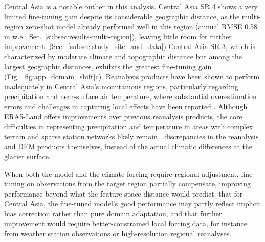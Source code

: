 \documentclass[draft]{agujournal2019}
\begin{document}
Central Asia is a notable outlier in this analysis. Central Asia SR 4 shows a very limited fine-tuning gain despite its considerable geographic distance, as the multi-region zero-shot model already performed well in this region (annual RMSE 0.58 m w.e.; Sec.~\ref{subsec:results-multi-region}), leaving little room for further improvement. (Sec.~\ref{subsec:study_site_and_data}) Central Asia SR 3, which is characterized by moderate climate and topographic distance but among the largest geographic distances, exhibits the greatest fine-tuning gain (Fig.~\ref{fig:app_domain_shift}c).  Reanalysis products have been shown to perform inadequately in Central Asia's mountainous regions, particularly regarding precipitation and near-surface air temperature, where substantial overestimation errors and challenges in capturing local effects have been reported \citep{Hu_2016, gummadi2025assessing, Barandun_2023}. Although ERA5-Land offers improvements over previous reanalysis products, the core difficulties in representing precipitation and temperature in areas with complex terrain and sparse station networks likely remain \citep{immerzeel2015reconciling, miao2024understanding}.  discrepancies in the reanalysis and DEM products themselves, instead of the actual climatic differences at the glacier surface. 

When both the model and the climate forcing require regional adjustment, fine-tuning on observations from the target region  partially compensate, improving performance beyond what the feature-space distance would predict.  that for Central Asia, the fine-tuned model's good performance may partly reflect implicit bias correction rather than pure domain adaptation, and that further improvement would require better-constrained local forcing data, for instance from weather station observations or high-resolution regional reanalyses.
\end{document}
